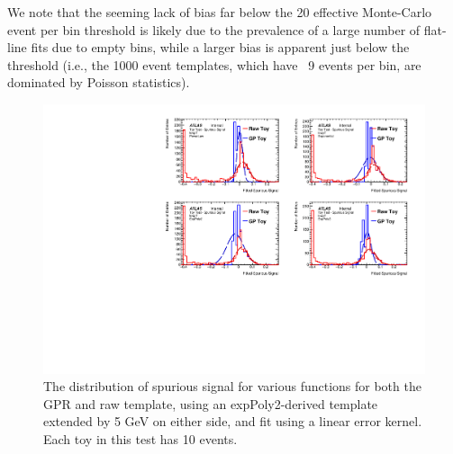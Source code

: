 We note that the seeming lack of bias far below the 20 effective Monte-Carlo event per bin threshold is likely due to the prevalence of a large number of flat-line fits due to empty bins, while a larger bias is apparent just below the threshold (i.e., the 1000 event templates, which have ~9 events per bin, are dominated by Poisson statistics).

\begin{figure} 
\begin{center}
  \includegraphics[width=\textwidth]{figures/background/gpr/validation/linear/ToyTest_FitSigVals_lowpT_10_noSig}   
\caption{The distribution of spurious signal for various functions for both the GPR and raw template, using an expPoly2-derived template extended by 5 GeV on either side, and fit using a linear error kernel. Each toy in this test has 10 events.}
\label{fig:linearkernel_lowpt_10_noSig}
\end{center}
\end{figure}

